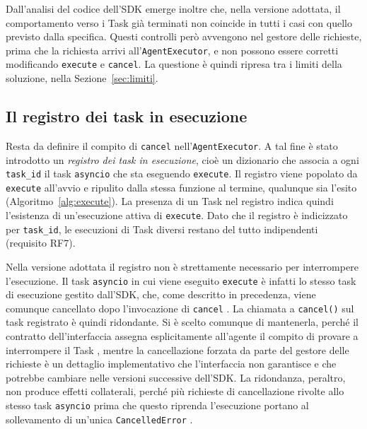 Dall'analisi del codice dell'SDK emerge inoltre che, nella versione adottata, il comportamento verso i Task già terminati non coincide in tutti i casi con quello previsto dalla specifica. Questi controlli però avvengono nel gestore delle richieste, prima che la richiesta arrivi all'\texttt{AgentExecutor}, e non possono essere corretti modificando \texttt{execute} e \texttt{cancel}. La questione è quindi ripresa tra i limiti della soluzione, nella Sezione~\ref{sec:limiti}.

\subsection{Il registro dei task in esecuzione}

Resta da definire il compito di \texttt{cancel} nell'\texttt{AgentExecutor}. A tal fine è stato introdotto un \emph{registro dei task in esecuzione}, cioè un dizionario che associa a ogni \texttt{task\_id} il task \texttt{asyncio} che sta eseguendo \texttt{execute}. Il registro viene popolato da \texttt{execute} all'avvio e ripulito dalla stessa funzione al termine, qualunque sia l'esito (Algoritmo~\ref{alg:execute}). La presenza di un Task nel registro indica quindi l'esistenza di un'esecuzione attiva di \texttt{execute}. Dato che il registro è indicizzato per \texttt{task\_id}, le esecuzioni di Task diversi restano del tutto indipendenti (requisito RF7).

Nella versione adottata il registro non è strettamente necessario per interrompere l'esecuzione. Il task \texttt{asyncio} in cui viene eseguito \texttt{execute} è infatti lo stesso task di esecuzione gestito dall'SDK, che, come descritto in precedenza, viene comunque cancellato dopo l'invocazione di \texttt{cancel} \cite{a2apythonsdk}. La chiamata a \texttt{cancel()} sul task registrato è quindi ridondante. Si è scelto comunque di mantenerla, perché il contratto dell'interfaccia assegna esplicitamente all'agente il compito di provare a interrompere il Task \cite{a2apythondocs}, mentre la cancellazione forzata da parte del gestore delle richieste è un dettaglio implementativo che l'interfaccia non garantisce e che potrebbe cambiare nelle versioni successive dell'SDK. La ridondanza, peraltro, non produce effetti collaterali, perché più richieste di cancellazione rivolte allo stesso task \texttt{asyncio} prima che questo riprenda l'esecuzione portano al sollevamento di un'unica \texttt{CancelledError} \cite{pythonasynciotask}.

